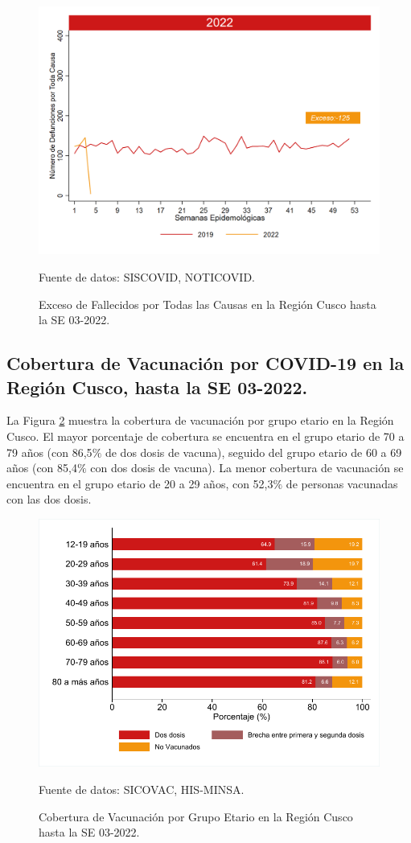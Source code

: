 \documentclass[12pt,a4paper,openany]{book}
\begin{document}
	\begin{figure}[h]
	\caption{Exceso de Fallecidos por Todas las Causas en la Región Cusco hasta la SE 03-2022.}\label{fig:exceso_regional}
	\begin{center}
		\includegraphics[width=0.85\linewidth]{../figuras/exceso_region_2022.png}
	\end{center}
	{\footnotesize {Fuente de datos: SISCOVID, NOTICOVID.}}
	\end{figure}
\clearpage

	\subsection*{Cobertura de Vacunación por COVID-19 en la Región Cusco, hasta la SE 03-2022.}
\noindent La Figura \ref{fig:vacuna_edad} muestra la cobertura de vacunación por grupo etario en la Región Cusco. El mayor porcentaje de cobertura se encuentra en el grupo etario de 70 a 79 años (con 86,5$\%$ de dos dosis de vacuna), seguido del grupo etario de 60 a 69 años  (con 85,4$\%$ con dos dosis de vacuna). La menor cobertura de vacunación se encuentra en el grupo etario de 20 a 29 años, con 52,3$\%$ de personas vacunadas con las dos dosis. 

\begin{figure}[h]
	\caption{Cobertura de Vacunación por Grupo Etario en la Región Cusco hasta la SE 03-2022. }\label{fig:vacuna_edad}
	\begin{center}
		\includegraphics[width=0.65\linewidth]{../figuras/vacunacion_grupo_edad.pdf}
	\end{center}
	{\footnotesize {Fuente de datos: SICOVAC, HIS-MINSA.}}
\end{figure}
\end{document}
